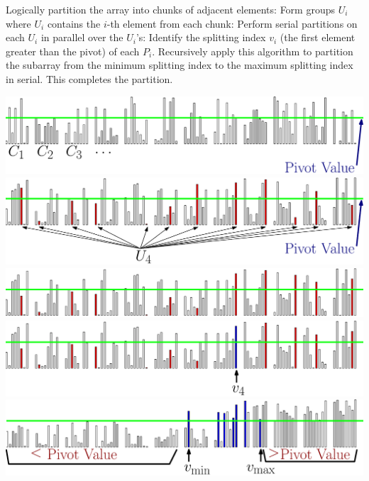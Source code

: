 \documentclass[xcolor=x11names, svgnames, rgb]{beamer}
\begin{document}
\begin{frame}[t]{}%
	\vspace{0.25cm}
	\begin{overprint}
	Logically partition the array into chunks of adjacent elements:
	\onslide<2>Form groups $U_i$ where $U_i$ contains the $i$-th element from each chunk:
	\onslide<3>Perform serial partitions on each $U_i$ in parallel over the $U_i$'s:
	\onslide<4>Identify the splitting index $v_i$ (the first element greater than the pivot) of each $P_i$. 
	\onslide<5>Recursively apply this algorithm to partition the subarray from the minimum splitting index to the maximum splitting index in serial. This completes the partition. 
	\end{overprint}
	\vspace{0.25cm}
	\begin{overprint}
	\includegraphics[width=\linewidth]{imgs/smoothedAlgSim/smoothedAlgSim_1.eps}
	\onslide<2>\includegraphics[width=\linewidth]{imgs/smoothedAlgSim/smoothedAlgSim_2.eps}
	\onslide<3>\includegraphics[width=\linewidth]{imgs/smoothedAlgSim/smoothedAlgSim_3.eps}
	\onslide<4>\includegraphics[width=\linewidth]{imgs/smoothedAlgSim/smoothedAlgSim_35.eps}
	\onslide<5>\includegraphics[width=\linewidth]{imgs/smoothedAlgSim/smoothedAlgSim_4.eps}

\end{overprint}
\end{frame}
\end{document}
